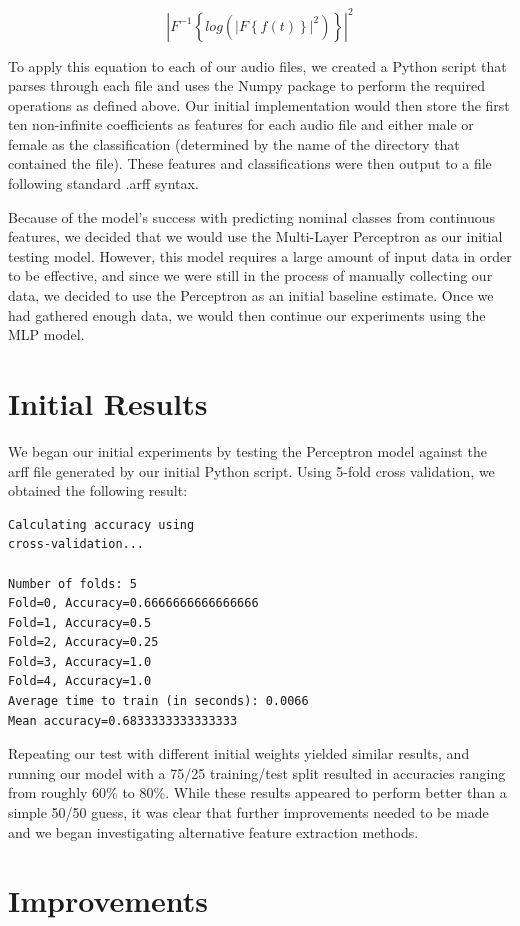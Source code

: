 \documentclass{article}
\begin{document}
$$
\left |{F}^{-1}\left \{log(\left |F\left \{f(t)\right \}\right |^2)\right \}  \right |^2 
$$

To apply this equation to each of our audio files, we created a Python script that parses through each file and uses the Numpy package to perform the required operations as defined above.  Our initial implementation would then store the first ten non-infinite coefficients as features for each audio file and either male or female as the classification (determined by the name of the directory that contained the file).  These features and classifications were then output to a file following standard .arff syntax.

Because of the model's success with predicting nominal classes from continuous features, we decided that we would use the Multi-Layer Perceptron as our initial testing model.  However, this model requires a large amount of input data in order to be effective, and since we were still in the process of manually collecting our data, we decided to use the Perceptron as an initial baseline estimate.  Once we had gathered enough data, we would then continue our experiments using the MLP model.

\section{Initial Results}

We began our initial experiments by testing the Perceptron model against the arff file generated by our initial Python script. Using 5-fold cross validation, we obtained the following result:

\begin{verbatim}
Calculating accuracy using
cross-validation...

Number of folds: 5
Fold=0, Accuracy=0.6666666666666666
Fold=1, Accuracy=0.5
Fold=2, Accuracy=0.25
Fold=3, Accuracy=1.0
Fold=4, Accuracy=1.0
Average time to train (in seconds): 0.0066
Mean accuracy=0.6833333333333333
\end{verbatim}

Repeating our test with different initial weights yielded similar results, and running our model with a 75/25 training/test split resulted in accuracies ranging from roughly 60\% to 80\%.  While these results appeared to perform better than a simple 50/50 guess, it was clear that further improvements needed to be made and we began investigating alternative feature extraction methods.

\section{Improvements}
\end{document}
